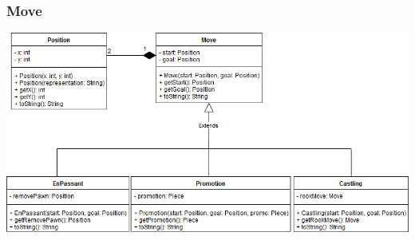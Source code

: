 \documentclass[parskip=full]{scrartcl}
\begin{document}
		\subsubsection{Move}
		
		\begin{minipage}{\linewidth}
			\centering
			\includegraphics[width=1\linewidth]{Diagramme/Move}
			\label{fig:move}
		\end{minipage}
\end{document}
